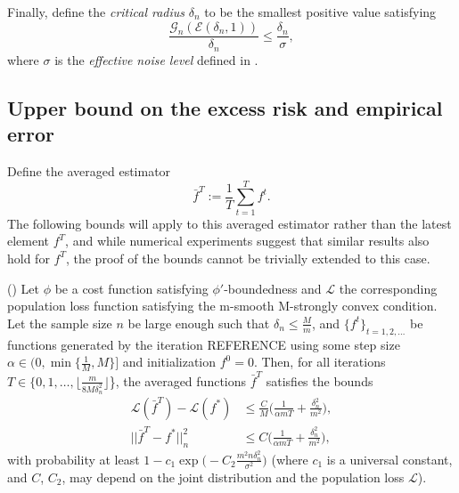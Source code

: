Finally, define the \textit{critical radius} $\delta_n$ to be the smallest positive value satisfying
\begin{equation}
\frac{\mathcal{G}_n(\mathcal{E}(\delta_n,1))}{\delta_n} \le \frac{\delta_n}{\sigma},
\end{equation}
where $\sigma$ is the \textit{effective noise level} defined in \cite{wain17ada}.

\subsection{Upper bound on the excess risk and empirical error}
Define the averaged estimator
\begin{equation*}
\bar{f}^T := \frac{1}{T}\sum_{t=1}^T f^t.
\end{equation*}
The following bounds will apply to this averaged estimator rather than the latest element $f^T$, and while numerical experiments suggest that similar results also hold for $f^T$, the proof of the bounds cannot be trivially extended to this case.

\begin{theorem}
\label{thmbound}
(\cite{wain17ada}) Let $\phi$ be a cost function satisfying $\phi'$-boundedness and $\mathcal{L}$ the corresponding population loss function satisfying the m-smooth M-strongly convex condition. Let the sample size $n$ be large enough such that $\delta_n\le \frac{M}{m}$, and $\{f^t\}_{t=1,2,\dots}$ be functions generated by the iteration REFERENCE using some step size $\alpha\in (0,\min\{\frac{1}{M}, M\}]$ and initialization $f^0=0$. Then, for all iterations $T\in \{0,1,\dots,\lfloor\frac{m}{8M\delta_n^2}\rfloor$\}, the averaged functions $\bar{f}^T$ satisfies the bounds
\begin{align}
\mathcal{L}(\bar{f}^T) - \mathcal{L}(f^*) &\le \frac{C}{M}\Big(\frac{1}{\alpha m T} + \frac{\delta_n^2}{m^2}\Big), \label{bound1} \\
||\bar{f}^T-f^*||_n^2 &\le C\Big(\frac{1}{\alpha m T} + \frac{\delta_n^2}{m^2}\Big), \label{bound2}
\end{align}
with probability at least $1-c_1\exp\big(-C_2\frac{m^2n\delta_n^2}{\sigma^2}\big)$ (where $c_1$ is a universal constant, and $C$, $C_2$, may depend on the joint distribution and the population loss $\mathcal{L}$).
\end{theorem}

